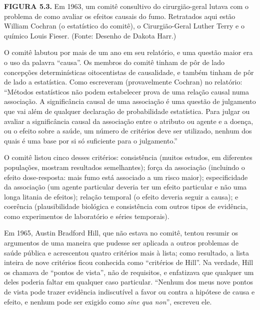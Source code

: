 \documentclass[11pt,a5paper,twoside]{book}
\begin{document}
\textbf{FIGURA 5.3.} Em 1963, um comitê consultivo do cirurgião-geral lutava com o problema de como avaliar os efeitos causais do fumo. Retratados aqui estão William Cochran (o estatístico do comitê), o Cirurgião-Geral Luther Terry e o químico Louis Fieser. (Fonte: Desenho de Dakota Harr.)

O comitê labutou por mais de um ano em seu relatório, e uma questão maior era o uso da palavra “causa”. Os membros do comitê tinham de pôr de lado concepções determinísticas oitocentistas de causalidade, e também tinham de pôr de lado a estatística. Como escreveram (provavelmente Cochran) no relatório: “Métodos estatísticos não podem estabelecer prova de uma relação causal numa associação. A significância causal de uma associação é uma questão de julgamento que vai além de qualquer declaração de probabilidade estatística. Para julgar ou avaliar a significância causal da associação entre o atributo ou agente e a doença, ou o efeito sobre a saúde, um número de critérios deve ser utilizado, nenhum dos quais é uma base por si só suficiente para o julgamento.”

O comitê listou cinco desses critérios: consistência (muitos estudos, em diferentes populações, mostram resultados semelhantes); força da associação (incluindo o efeito dose-resposta: mais fumo está associado a um risco maior); especificidade da associação (um agente particular deveria ter um efeito particular e não uma longa litania de efeitos); relação temporal (o efeito deveria seguir a causa); e coerência (plausibilidade biológica e consistência com outros tipos de evidência, como experimentos de laboratório e séries temporais).

Em 1965, Austin Bradford Hill, que não estava no comitê, tentou resumir os argumentos de uma maneira que pudesse ser aplicada a outros problemas de saúde pública e acrescentou quatro critérios mais à lista; como resultado, a lista inteira de nove critérios ficou conhecida como “critérios de Hill”. Na verdade, Hill os chamava de “pontos de vista”, não de requisitos, e enfatizava que qualquer um deles poderia faltar em qualquer caso particular. “Nenhum dos meus nove pontos de vista pode trazer evidência indiscutível a favor ou contra a hipótese de causa e efeito, e nenhum pode ser exigido como \textit{sine qua non}”, escreveu ele.
\end{document}
